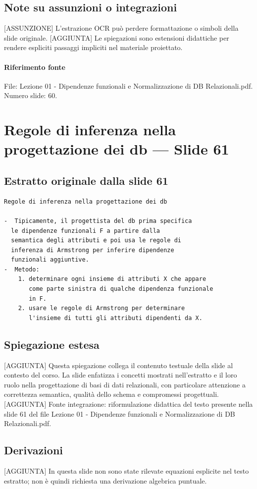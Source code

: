 \documentclass[11pt]{article}
\begin{document}
\subsection*{Note su assunzioni o integrazioni}
[ASSUNZIONE] L'estrazione OCR può perdere formattazione o simboli della slide originale.
[AGGIUNTA] Le spiegazioni sono estensioni didattiche per rendere espliciti passaggi impliciti nel materiale proiettato.
\paragraph{Riferimento fonte} File: Lezione 01 - Dipendenze funzionali e Normalizzazione di DB Relazionali.pdf. Numero slide: 60.
\section{Regole di inferenza nella progettazione dei db --- Slide 61}
\subsection*{Estratto originale dalla slide 61}
\begin{lstlisting}
Regole di inferenza nella progettazione dei db

-  Tipicamente, il progettista del db prima specifica
  le dipendenze funzionali F a partire dalla
  semantica degli attributi e poi usa le regole di
  inferenza di Armstrong per inferire dipendenze
  funzionali aggiuntive.
-  Metodo:
    1. determinare ogni insieme di attributi X che appare
       come parte sinistra di qualche dipendenza funzionale
       in F.
    2. usare le regole di Armstrong per determinare
       l'insieme di tutti gli attributi dipendenti da X.
\end{lstlisting}
\subsection*{Spiegazione estesa}
[AGGIUNTA] Questa spiegazione collega il contenuto testuale della slide al contesto del corso. La slide enfatizza i concetti mostrati nell'estratto e il loro ruolo nella progettazione di basi di dati relazionali, con particolare attenzione a correttezza semantica, qualità dello schema e compromessi progettuali.
[AGGIUNTA] Fonte integrazione: riformulazione didattica del testo presente nella slide 61 del file Lezione 01 - Dipendenze funzionali e Normalizzazione di DB Relazionali.pdf.
\subsection*{Derivazioni}
[AGGIUNTA] In questa slide non sono state rilevate equazioni esplicite nel testo estratto; non è quindi richiesta una derivazione algebrica puntuale.
\end{document}

